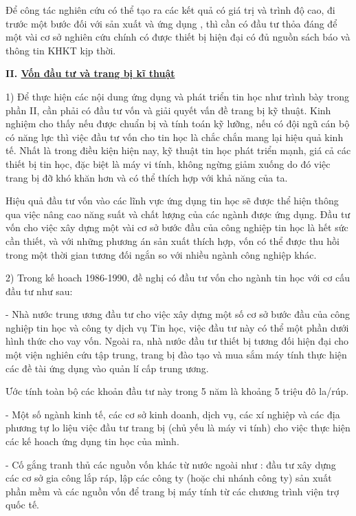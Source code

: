 \documentclass[11pt, a4paper, reqno, oneside]{book}
\begin{document}
Để công tác nghiên cứu có thể tạo ra các kết quả có giá trị và trình độ cao, đi trước một bước đối với sản xuất và ứng dụng , thì cần có đầu tư thỏa đáng để một vài cơ sở nghiên cứu chính có được thiết bị hiện đại có đủ nguồn sách báo và thông tin KHKT kịp thời.


\textbf{II. \underline{ Vốn đầu tư và trang bị kĩ thuật}}


1)	Để thực hiện các nội dung ứng dụng và phát triển tin học như trình bày trong phần II, cần phải có đầu tư vốn và giải quyết vấn đề trang bị kỹ thuật. Kinh nghiệm cho thấy nếu được chuẩn bị và tính toán kỹ lưỡng, nếu có đội ngũ cán bộ có năng lực thì việc đầu tư vốn cho tin học là chắc chắn mang lại hiệu quả kinh tế. Nhất là trong điều kiện hiện nay, kỹ thuật tin học phát triển mạnh, giá cả các thiết bị tin học, đặc biệt là máy vi tính, không ngừng giảm xuống do đó việc trang bị đỡ khó khăn hơn và có thể thích hợp với khả năng của ta.


Hiệu quả đầu tư vốn vào các lĩnh vực ứng dụng tin học sẽ được thể hiện thông qua việc nâng cao năng suất và chất lượng của các ngành được ứng dụng. Đầu tư vốn cho việc xây dựng một vài cơ sở bước đầu của công nghiệp tin học là hết sức cần thiết, và với những phương án sản xuất thích hợp, vốn có thể được thu hồi trong một thời gian tương đối ngắn so với nhiều ngành công nghiệp khác.


2)	Trong kế hoach 1986-1990, đề nghị có đầu tư vốn cho ngành tin học với cơ cấu đầu tư như sau:


-	Nhà nước trung ương đầu tư cho việc xây dựng một số cơ sở bước đầu của công nghiệp tin học và công ty dịch vụ Tin học, việc đầu tư này có thể một phần dưới hình thức cho vay vốn. Ngoài ra, nhà nước đầu tư thiết bị tương đối hiện đại cho một viện nghiên cứu tập trung, trang bị đào tạo và mua sắm máy tính thực hiện các đề tài ứng dụng vào quản lí cấp trung ương.


Ước tính toàn bộ các khoản đầu tư này trong 5 năm là khoảng 5 triệu đô la/rúp.


-	Một số ngành kinh tế, các cơ sở kinh doanh, dịch vụ, các xí nghiệp và các địa phương tự lo liệu việc đầu tư trang bị (chủ yếu là máy vi tính) cho việc thực hiện các kế hoach ứng dụng tin học của mình.


-	Cố gắng tranh thủ các nguồn vốn khác từ nước ngoài như : đầu tư xây dựng các cơ sở gia công lắp ráp, lập các công ty (hoặc chi nhánh công ty) sản xuất phần mềm và các nguồn vốn để trang bị máy tính từ các chương trình viện trợ quốc tế.
\end{document}
